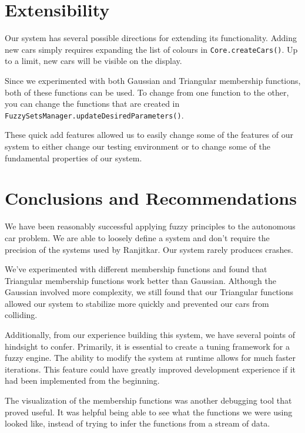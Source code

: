 \documentclass[12pt,letterpaper,oneside]{report}
\newcommand \java[1]{\texttt{#1}}
\begin{document}
\clearpage
\section{Extensibility}
Our system has several possible directions for extending its functionality.
Adding new cars simply requires expanding the list of colours in
\java{Core.createCars()}. Up to a limit, new cars will be visible on the
display.

Since we experimented with both Gaussian and Triangular membership functions,
both of these functions can be used. To change from one function to the other,
you can change the functions that are created in
\java{FuzzySetsManager.updateDesiredParameters()}.

These quick add features allowed us to easily change some of the features of
our system to either change our testing environment or to change some of the
fundamental properties of our system.

\section{Conclusions and Recommendations}

We have been reasonably successful applying fuzzy principles to the autonomous
car problem. We are able to loosely define a system and don't require the
precision of the systems used by Ranjitkar\cite{Ranjitkar}. Our system rarely
produces crashes.

We've experimented with different membership functions and found that
Triangular membership functions work better than Gaussian. Although the Gaussian involved more
complexity, we still found that our Triangular functions allowed our system to
stabilize more quickly and prevented our cars from colliding.

Additionally, from our experience building this system, we have several points
of hindsight to confer. Primarily, it is essential to create a tuning framework
for a fuzzy engine. The ability to modify the system at runtime allows for much
faster iterations. This feature could have greatly improved development
experience if it had been implemented from the beginning.

The visualization of the membership functions was another debugging tool that
proved useful. It was helpful being able to see what the functions we were 
using looked like,
instead of trying to infer the functions from a stream of data.
\end{document}
